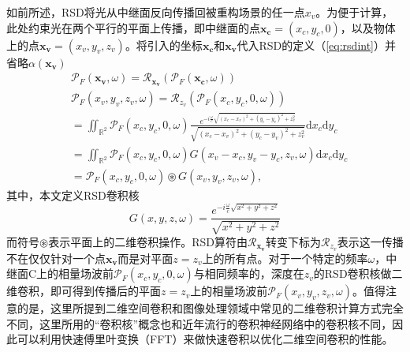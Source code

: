 \documentclass[master]{shtthesis}             %
\begin{document}
如前所述，RSD将光从中继面反向传播回被重构场景的任一点$x_v$。为便于计算，此处约束光在两个平行的平面上传播，即中继面的点$\mathbf{x_c}=(x_c,y_c,0)$，以及物体上的点$\mathbf{x_v}=(x_v,y_v,z_v)$。将引入的坐标$\mathbf{x_c}$和$\mathbf{x_v}$代入RSD的定义（\ref{eq:rsdint}）并省略$\alpha(\mathbf{x_v})$
\begin{equation}\label{eq:rsdconv}
  \begin{split}
    &\mathcal{P}_F(\mathbf{x_v},\omega) = \mathcal{R}_{\mathbf{x_v}}\left( \mathcal{P}_F(\mathbf{x_c},\omega) \right) \\
    &\mathcal{P}_F(x_v,y_v,z_v,\omega) = \mathcal{R}_{z_v}\left( \mathcal{P}_F(x_c,y_c,0,\omega) \right)\\
    &= \iint_{\mathbb{R}^2}\mathcal{P}_F(x_c,y_c,0,\omega)\frac{e^{-i\frac{\omega}{c}\sqrt{(x_c-x_v)^2+(y_c-y_v)^2+z_v^2}}}{\sqrt{(x_c-x_v)^2+(y_c-y_v)^2+z_v^2}} \text{d}x_c\text{d}y_c \\
    &= \iint_{\mathbb{R}^2}\mathcal{P}_F(x_c,y_c,0,\omega) G(x_v-x_c,y_v-y_c,z_v,\omega) \text{d}x_c\text{d}y_c \\
    &= \mathcal{P}_F(x_c,y_c,0,\omega) \circledast G(x_v,y_v,z_v,\omega),
  \end{split}
\end{equation}
其中，本文定义RSD卷积核
\begin{equation}
  G(x,y,z,\omega) = \frac{e^{-i\frac{\omega}{c}\sqrt{x^2+y^2+z^2}}}{\sqrt{x^2+y^2+z^2}}
\end{equation}
而符号$\circledast$表示平面上的二维卷积操作。RSD算符由$\mathcal{R}_{\mathbf{x_v}}$转变下标为$\mathcal{R}_{z_v}$表示这一传播不在仅仅针对一个点$\mathbf{x_v}$而是对平面$z=z_v$上的所有点。对于一个特定的频率$\omega$，中继面C上的相量场波前$\mathcal{P}_F(x_c,y_c,0,\omega)$与相同频率的，深度在$z_v$的RSD卷积核做二维卷积，即可得到传播后的平面$z=z_v$上的相量场波前$\mathcal{P}_F(x_v,y_v,z_v,\omega)$。值得注意的是，这里所提到二维空间卷积和图像处理领域中常见的二维卷积计算方式完全不同，这里所用的“卷积核”概念也和近年流行的卷积神经网络中的卷积核不同，因此可以利用快速傅里叶变换（FFT）来做快速卷积以优化二维空间卷积的性能。

\end{document}
